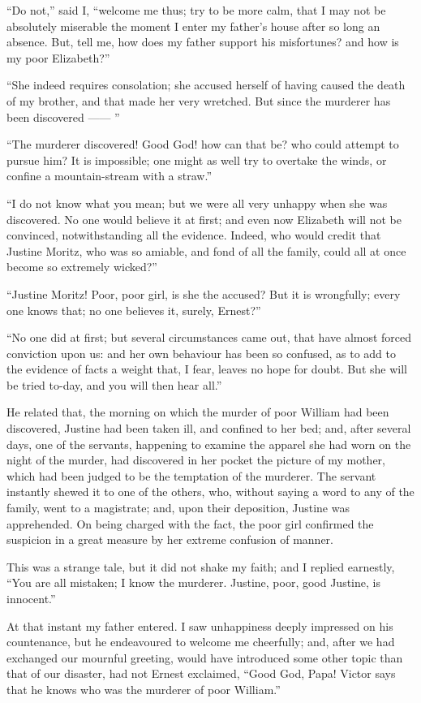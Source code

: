 ``Do not,'' said I, ``welcome me
thus; try to be more calm, that I may
not be absolutely miserable the moment
I enter my father's house after so long
an absence. But, tell me, how does
my father support his misfortunes? and
how is my poor Elizabeth?''

``She indeed requires consolation;
she accused herself of having caused
the death of my brother, and that made
her very wretched. But since the
murderer has been discovered ------ ''

``The murderer discovered! Good
God! how can that be? who could attempt
to pursue him? It is impossible;
one might as well try to overtake the
winds, or confine a mountain-stream
with a straw.''

``I do not know what you mean;
but we were all very unhappy when
she was discovered. No one would
believe it at first; and even now Elizabeth
will not be convinced, notwithstanding
all the evidence. Indeed, who
would credit that Justine Moritz, who
was so amiable, and fond of all the
family, could all at once become so
extremely wicked?''

``Justine Moritz! Poor, poor girl,
is she the accused? But it is wrongfully;
every one knows that; no one
believes it, surely, Ernest?''

``No one did at first; but several circumstances
came out, that have almost
forced conviction upon us: and her
own behaviour has been so confused,
as to add to the evidence of facts a
weight that, I fear, leaves no hope for
doubt. But she will be tried to-day,
and you will then hear all.''

He related that, the morning on
which the murder of poor William had
been discovered, Justine had been taken
ill, and confined to her bed; and, after
several days, one of the servants, happening
to examine the apparel she had
worn on the night of the murder, had
discovered in her pocket the picture of
my mother, which had been judged to
be the temptation of the murderer.
The servant instantly shewed it to one
of the others, who, without saying a
word to any of the family, went to a
magistrate; and, upon their deposition,
Justine was apprehended. On being
charged with the fact, the poor girl confirmed
the suspicion in a great measure
by her extreme confusion of
manner.

This was a strange tale, but it did
not shake my faith; and I replied earnestly,
``You are all mistaken; I know
the murderer. Justine, poor, good Justine,
is innocent.''

At that instant my father entered.
I saw unhappiness deeply impressed
on his countenance, but he endeavoured
to welcome me cheerfully; and,
after we had exchanged our mournful
greeting, would have introduced some
other topic than that of our disaster,
had not Ernest exclaimed, ``Good
God, Papa! Victor says that he knows
who was the murderer of poor William.''

